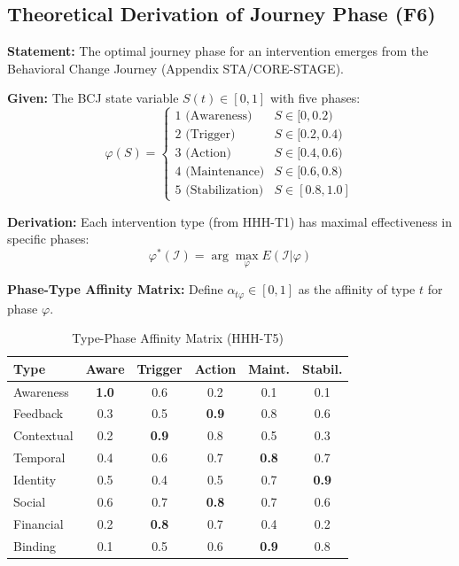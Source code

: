 \subsection{Theoretical Derivation of Journey Phase (F6)}
\label{sec:hhh-phase}

\begin{tcolorbox}[colback=blue!5!white, colframe=blue!75!black,
    title=\textbf{Theorem HHH-T5: Journey Phase Emergence from STAGE}]

\textbf{Statement:} The optimal journey phase for an intervention emerges from the Behavioral Change Journey (Appendix STA/CORE-STAGE).

\textbf{Given:} The BCJ state variable $S(t) \in [0, 1]$ with five phases:
\begin{equation}
\varphi(S) = \begin{cases}
1 \text{ (Awareness)} & S \in [0, 0.2) \\
2 \text{ (Trigger)} & S \in [0.2, 0.4) \\
3 \text{ (Action)} & S \in [0.4, 0.6) \\
4 \text{ (Maintenance)} & S \in [0.6, 0.8) \\
5 \text{ (Stabilization)} & S \in [0.8, 1.0]
\end{cases}
\end{equation}

\textbf{Derivation:} Each intervention type (from HHH-T1) has maximal effectiveness in specific phases:
\begin{equation}
\varphi^*(\mathcal{I}) = \arg\max_{\varphi} E(\mathcal{I} | \varphi)
\label{eq:hhh-phase-mapping}
\end{equation}

\textbf{Phase-Type Affinity Matrix:} Define $\alpha_{t\varphi} \in [0,1]$ as the affinity of type $t$ for phase $\varphi$.

\end{tcolorbox}

\begin{table}[htbp]
\centering
\caption{Type-Phase Affinity Matrix (HHH-T5)}
\label{tab:hhh-phase-affinity}
\renewcommand{\arraystretch}{1.2}
\small
\begin{tabular}{@{}l|ccccc@{}}
\toprule
\textbf{Type} & \textbf{Aware} & \textbf{Trigger} & \textbf{Action} & \textbf{Maint.} & \textbf{Stabil.} \\
\midrule
Awareness & \textbf{1.0} & 0.6 & 0.2 & 0.1 & 0.1 \\
Feedback & 0.3 & 0.5 & \textbf{0.9} & 0.8 & 0.6 \\
Contextual & 0.2 & \textbf{0.9} & 0.8 & 0.5 & 0.3 \\
Temporal & 0.4 & 0.6 & 0.7 & \textbf{0.8} & 0.7 \\
Identity & 0.5 & 0.4 & 0.5 & 0.7 & \textbf{0.9} \\
Social & 0.6 & 0.7 & \textbf{0.8} & 0.7 & 0.6 \\
Financial & 0.2 & \textbf{0.8} & 0.7 & 0.4 & 0.2 \\
Binding & 0.1 & 0.5 & 0.6 & \textbf{0.9} & 0.8 \\
\bottomrule
\end{tabular}
\end{table}



